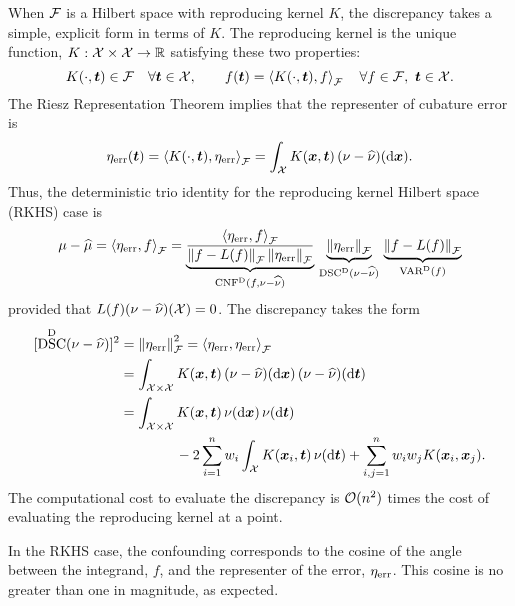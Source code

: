 \documentclass[graybox,footinfo]{svmult}
\DeclareMathOperator{\algn}{CNF}
\DeclareMathOperator{\disc}{DSC}
\DeclareMathOperator{\Var}{VAR}
\begin{document}
When $\cf$ is a Hilbert space with reproducing kernel $K$, the discrepancy takes a 
simple, explicit form in terms of $K$.  The reproducing kernel is the unique function, $K: 
\cx \times \cx \to \R$ satisfying these two properties:
\begin{equation}
K(\cdot,\bst) \in \cf \quad \forall \bst \in \cx, \qquad f(\bst) = \ip[\cf]{K(\cdot,\bst)}{f} 
\quad \forall f \in \cf, \ \bst \in \cx.
\end{equation}
The Riesz Representation Theorem implies that the representer of cubature error 
is 
\begin{equation}
\eta_{\err}(\bst) = \ip[\cf]{K(\cdot,\bst)}{\eta_{\err}} = \int_{\cx} K(\bsx,\bst) \, (\nu - 
\hnu)(\D\bsx).
\end{equation}
Thus, the deterministic trio identity for the reproducing kernel Hilbert space (RKHS) case 
is
\begin{equation}
\mu - \widehat{\mu} =  \ip[\cf]{\eta_{\err}}{f} = 
\underbrace{\frac{\ip[\cf]{\eta_{\err}}{f}}{\norm{f - 
L(f)}_{\cf} \norm{\eta_{\err}}_{\cf}} }_{\algn^\Dt(f,\nu - \hnu)}\, 
\underbrace{\norm{\eta_{\err}}_{\cf}}_{\disc^{\Dt}(\nu - \hnu)} \, 
\underbrace{\norm{f - L(f)}_{\cf}}_{\Var^\Dt(f)}
\end{equation}
provided that $L(f) (\nu - \hnu)(\calX) = 0$.  The discrepancy  takes the 
form \cite{Hic99a}
\begin{align}
\nonumber
[\disc^{\Dt}(\nu - \hnu)]^2 & = \norm{\eta_{\err}}_{\cf}^2 = \ip[\cf]{\eta_{\err}}{\eta_{\err}} 
\\
\nonumber
& = \int_{\cx \times \cx} K(\bsx,\bst) \, (\nu - \hnu)(\D \bsx) \, (\nu - \hnu)(\D \bst) \\
\nonumber
& = \int_{\cx \times \cx} K(\bsx,\bst) \, \nu(\D \bsx) \, \nu (\D \bst)  \\
& \qquad \qquad - 2 \sum_{i=1}^n w_i 
\int_{\cx} K(\bsx_i,\bst) \, \nu(\D \bst)+ \sum_{i,j = 1}^n w_iw_jK(\bsx_i,\bsx_j).
\end{align}
The computational cost to evaluate the discrepancy is $\Order(n^2)$ times the cost of 
evaluating the reproducing kernel at a point. 

\begin{FJHLesson} \FJHLessonTwoHalf \end{FJHLesson}

In the RKHS case, the confounding corresponds to 
the cosine of the angle between the integrand, $f$, and the representer of the error, 
$\eta_{\err}$.  This cosine is no greater than one in magnitude, as expected.
\end{document}
